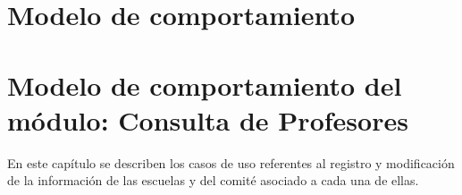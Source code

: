 \documentclass[10pt]{book}
\begin{document}
%    
\chapter{Modelo de comportamiento}\label{chp:modeloComportamiento}

\chapter{Modelo de comportamiento del módulo: Consulta de Profesores \label{chp:modeloComportamientoProfesores}}
En este capítulo se describen los casos de uso referentes al registro y modificación de la información de las escuelas y del comité asociado a cada una de ellas. \bigskip
\end{document}
